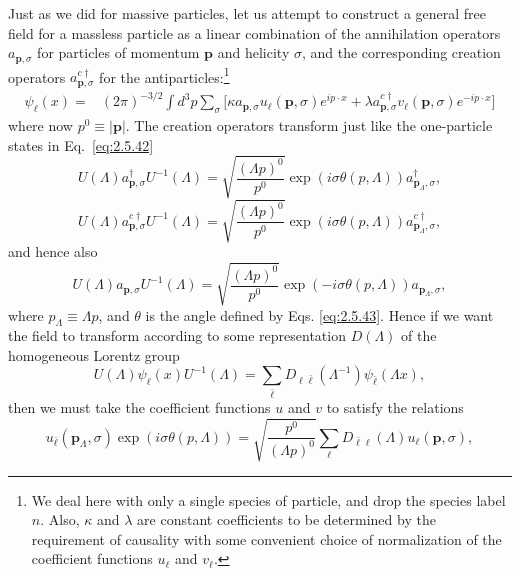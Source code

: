 Just as we did for massive particles, let us attempt to construct a general
free field for a massless particle as a linear combination of the annihilation
operators $a_{\mathbf p,\sigma}$ for particles of momentum $\mathbf p$ and
helicity $\sigma$, and the corresponding creation operators
$a^{c\dagger}_{\mathbf p,\sigma}$ for the antiparticles:\footnote{We deal here
with only a single species of particle, and drop the species label $n$. Also,
$\kappa$ and $\lambda$ are constant coefficients to be determined by the
requirement of causality with some convenient choice of normalization of the
coefficient functions $u_\ell$ and $v_\ell$.}
\begin{align}
\psi_\ell(x)={}&(2\pi)^{-3/2}\int d^3p\sum_\sigma
\bigl[\kappa a_{\mathbf p,\sigma}u_\ell(\mathbf p,\sigma)e^{ip\cdot x}
+\lambda a^{c\dagger}_{\mathbf p,\sigma}
v_\ell(\mathbf p,\sigma)e^{-ip\cdot x}\bigr]
\tag{5.9.1}\label{eq:5.9.1}
\end{align}
where now $p^0\equiv|\mathbf p|$. The creation operators transform just like
the one-particle states in Eq.~\eqref{eq:2.5.42}
\begin{equation}
U(\Lambda)a^\dagger_{\mathbf p,\sigma}U^{-1}(\Lambda)=
\sqrt{\frac{(\Lambda p)^0}{p^0}}\exp(i\sigma\theta(p,\Lambda))
a^\dagger_{\mathbf p_\Lambda,\sigma},
\tag{5.9.2}\label{eq:5.9.2}
\end{equation}
\begin{equation}
U(\Lambda)a^{c\dagger}_{\mathbf p,\sigma}U^{-1}(\Lambda)=
\sqrt{\frac{(\Lambda p)^0}{p^0}}\exp(i\sigma\theta(p,\Lambda))
a^{c\dagger}_{\mathbf p_\Lambda,\sigma},
\tag{5.9.3}\label{eq:5.9.3}
\end{equation}
and hence also
\begin{equation}
U(\Lambda)a_{\mathbf p,\sigma}U^{-1}(\Lambda)=
\sqrt{\frac{(\Lambda p)^0}{p^0}}\exp(-i\sigma\theta(p,\Lambda))
a_{\mathbf p_\Lambda,\sigma},
\tag{5.9.4}\label{eq:5.9.4}
\end{equation}
where $p_\Lambda\equiv\Lambda p$, and $\theta$ is the angle defined by Eqs.
\eqref{eq:2.5.43}. Hence if we want the field to transform according to some
representation $D(\Lambda)$ of the homogeneous Lorentz group
\begin{equation}
U(\Lambda)\psi_\ell(x)U^{-1}(\Lambda)=
\sum_{\bar\ell}D_{\ell\bar\ell}(\Lambda^{-1})
\psi_{\bar\ell}(\Lambda x),
\tag{5.9.5}\label{eq:5.9.5}
\end{equation}
then we must take the coefficient functions $u$ and $v$ to satisfy the
relations
\begin{equation}
u_{\bar\ell}(\mathbf p_\Lambda,\sigma)
\exp(i\sigma\theta(p,\Lambda))=
\sqrt{\frac{p^0}{(\Lambda p)^0}}
\sum_\ell D_{\bar\ell\ell}(\Lambda)u_\ell(\mathbf p,\sigma),
\tag{5.9.6}\label{eq:5.9.6}
\end{equation}
